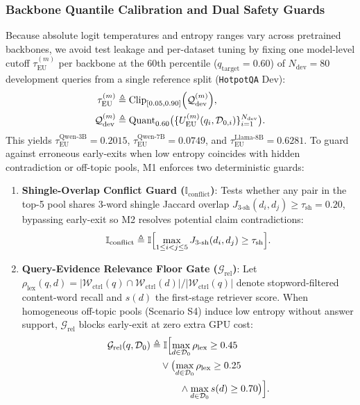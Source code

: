 \documentclass[11pt]{article}
\begin{document}
\subsubsection{Backbone Quantile Calibration and Dual Safety Guards}
Because absolute logit temperatures and entropy ranges vary across pretrained backbones, we avoid test leakage and per-dataset tuning by fixing one model-level cutoff $\tau_{\text{EU}}^{(m)}$ per backbone at the 60th percentile ($q_{\text{target}} = 0.60$) of $N_{\text{dev}} = 80$ development queries from a single reference split (\texttt{HotpotQA} Dev):
\begin{align}
\tau_{\text{EU}}^{(m)} &\triangleq \text{Clip}_{[0.05, 0.90]}\Bigl( \mathcal{Q}_{\text{dev}}^{(m)} \Bigr), \label{eq:m1_anchor_tau} \\
\mathcal{Q}_{\text{dev}}^{(m)} &\triangleq \mathrm{Quant}_{0.60}\bigl(\{ U_{\text{EU}}^{(m)}(q_i, \mathcal{D}_{0,i}) \}_{i=1}^{N_{\text{dev}}}\bigr). \nonumber
\end{align}
This yields $\tau_{\text{EU}}^{\text{Qwen-3B}} = 0.2015$, $\tau_{\text{EU}}^{\text{Qwen-7B}} = 0.0749$, and $\tau_{\text{EU}}^{\text{Llama-8B}} = 0.6281$. To guard against erroneous early-exits when low entropy coincides with hidden contradiction or off-topic pools, M1 enforces two deterministic guards:
\begin{enumerate}[leftmargin=*,nosep]
    \item \textbf{Shingle-Overlap Conflict Guard ($\mathbb{I}_{\text{conflict}}$)}: Tests whether any pair in the top-5 pool shares 3-word shingle Jaccard overlap $J_{3\text{-sh}}(d_i, d_j) \ge \tau_{\text{sh}} = 0.20$, bypassing early-exit so M2 resolves potential claim contradictions:
    \begin{equation}
    \mathbb{I}_{\text{conflict}} \triangleq \mathbb{I}\Bigl[ \max_{1 \le i < j \le 5} J_{3\text{-sh}}(d_i, d_j) \ge \tau_{\text{sh}} \Bigr].
    \label{eq:m1_conflict_bypass}
    \end{equation}
    \item \textbf{Query-Evidence Relevance Floor Gate ($\mathcal{G}_{\text{rel}}$)}: Let $\rho_{\text{lex}}(q, d) = |\mathcal{W}_{\text{ctrl}}(q) \cap \mathcal{W}_{\text{ctrl}}(d)| / |\mathcal{W}_{\text{ctrl}}(q)|$ denote stopword-filtered content-word recall and $s(d)$ the first-stage retriever score. When homogeneous off-topic pools (Scenario S4) induce low entropy without answer support, $\mathcal{G}_{\text{rel}}$ blocks early-exit at zero extra GPU cost:
    \begin{align}
    \mathcal{G}_{\text{rel}}(q, \mathcal{D}_0) &\triangleq \mathbb{I}\Bigl[ \max_{d \in \mathcal{D}_0}\rho_{\text{lex}} \ge 0.45 \nonumber \\
    &\quad \lor \bigl(\max_{d \in \mathcal{D}_0}\rho_{\text{lex}} \ge 0.25 \nonumber \\
    &\qquad\quad \land \max_{d \in \mathcal{D}_0} s(d) \ge 0.70\bigr) \Bigr].
    \label{eq:m1_rel_gate}
    \end{align}
\end{enumerate}
\end{document}

